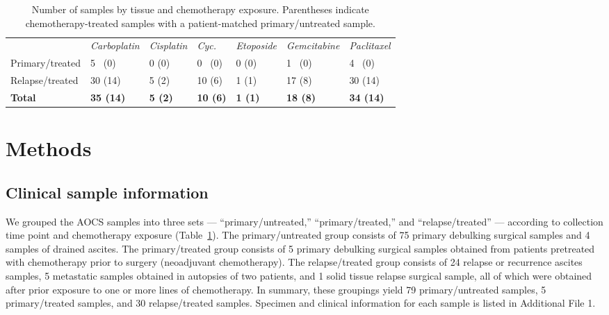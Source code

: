 \documentclass[linenumbers]{bmcart}
\begin{document}
\begin{table}[]
\centering
\begin{tabular}{lllllll}
                & \textit{Carboplatin} & \textit{Cisplatin} & \textit{Cyc.}   & \textit{Etoposide} & \textit{Gemcitabine} & \textit{Paclitaxel} \\
Primary/treated & 5 \, (0)                & 0 (0)              & 0  \, (0)              & 0 (0)                 & 1 \, (0)                & 4 \, (0)               \\
Relapse/treated & 30 (14)              & 5 (2)              & 10 (6)          & 1 (1)              & 17 (8)               & 30 (14)             \\
\textbf{Total}  & \textbf{35 (14)}     & \textbf{5 (2)}     & \textbf{10 (6)} & \textbf{1 (1)}     & \textbf{18 (8)}      & \textbf{34 (14)}   
\end{tabular}
\hspace{\linewidth}
\caption{Number of samples by tissue and chemotherapy exposure. Parentheses indicate chemotherapy-treated samples with a patient-matched primary/untreated sample.}\label{tab:samples}

\end{table}


\section*{Methods}
\subsection*{Clinical sample information}
We grouped the AOCS samples into three sets --- ``primary/untreated,'' ``primary/treated,'' and ``relapse/treated'' --- according to collection time point and chemotherapy exposure (Table~\ref{tab:samples}). The primary/untreated group consists of 75 primary debulking surgical samples and 4 samples of drained ascites. The primary/treated group consists of 5 primary debulking surgical samples obtained from patients pretreated with chemotherapy prior to surgery (neoadjuvant chemotherapy). The relapse/treated group consists of 24 relapse or recurrence ascites samples, 5 metastatic samples obtained in autopsies of two patients, and 1 solid tissue relapse surgical sample, all of which were obtained after prior exposure to one or more lines of chemotherapy.  In summary, these groupings yield 79 primary/untreated samples, 5 primary/treated samples, and 30 relapse/treated samples. Specimen and clinical information for each sample is listed in Additional File 1.
\end{document}
